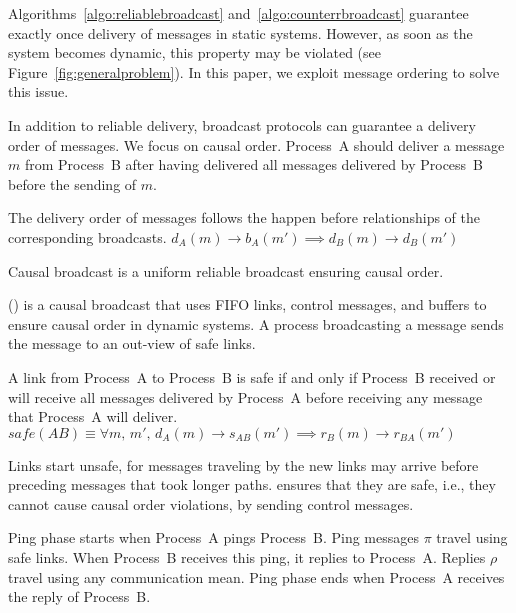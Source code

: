 Algorithms~\ref{algo:reliablebroadcast} and~\ref{algo:counterrbroadcast}
guarantee exactly once delivery of messages in static systems. However, as soon
as the system becomes dynamic, this property may be violated (see
Figure~\ref{fig:generalproblem}). In this paper, we exploit message ordering to
solve this issue.


In addition to reliable delivery, broadcast protocols can guarantee a delivery
order of messages. We focus on causal order. Process~A should deliver a message
$m$ from Process~B after having delivered all messages delivered by Process~B
before the sending of $m$.

\begin{definition}
  The delivery order of messages follows the happen before relationships of the
  corresponding broadcasts.
  $d_A(m) \rightarrow b_A(m') \implies d_B(m) \rightarrow d_B(m')$
\end{definition}

\begin{definition}
  Causal broadcast is a uniform reliable broadcast ensuring causal order.
\end{definition}

\PCBROADCAST (\REF) is a causal broadcast that uses FIFO links, control
messages, and buffers to ensure causal order in dynamic systems. A process
broadcasting a message sends the message to an out-view of safe links.

\begin{definition} 
  A link from Process~A to Process~B is safe if and only if Process~B received
  or will receive all messages delivered by Process~A before receiving any
  message that Process~A will
  deliver. $safe(AB) \equiv \forall m,\, m',\, d_A(m) \rightarrow s_{AB}(m')
  \implies r_B(m) \rightarrow r_{BA}(m')$
\end{definition}

Links start unsafe, for messages traveling by the new links may arrive before
preceding messages that took longer paths. \PCBROADCAST ensures that they are
safe, i.e., they cannot cause causal order violations, by sending control
messages.

\begin{definition}
  Ping phase starts when Process~A pings Process~B. Ping messages $\pi$ travel
  using safe links. When Process~B receives this ping, it replies to
  Process~A. Replies $\rho$ travel using any communication mean. Ping phase ends
  when Process~A receives the reply of Process~B.
\end{definition}


